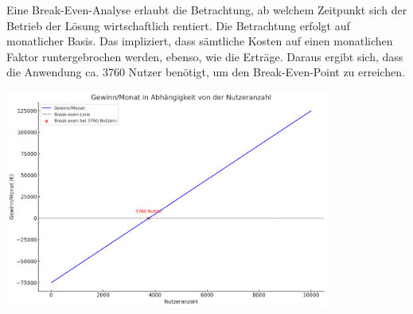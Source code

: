 Eine Break-Even-Analyse erlaubt die Betrachtung, ab welchem Zeitpunkt sich der Betrieb der Lösung wirtschaftlich rentiert.
Die Betrachtung erfolgt auf monatlicher Basis.
Das impliziert, dass sämtliche Kosten auf einen monatlichen Faktor runtergebrochen werden, ebenso, wie die Erträge.
Daraus ergibt sich, dass die Anwendung ca. 3760 Nutzer benötigt, um den Break-Even-Point zu erreichen.

\includegraphics[width=0.8\textwidth]{abbildungen/Break_Even}
